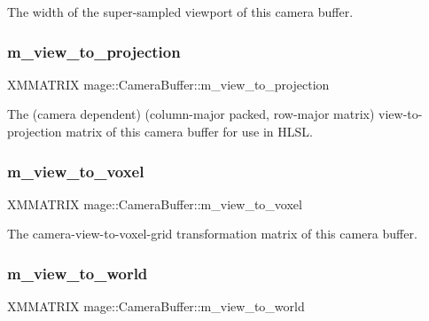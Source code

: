 The width of the super-\/sampled viewport of this camera buffer. \hypertarget{structmage_1_1_camera_buffer_aa23d2ecaed10960832215c2397884421}{}\label{structmage_1_1_camera_buffer_aa23d2ecaed10960832215c2397884421} 
\subsubsection{\texorpdfstring{m\+\_\+view\+\_\+to\+\_\+projection}{m\_view\_to\_projection}}
{\footnotesize\ttfamily X\+M\+M\+A\+T\+R\+IX mage\+::\+Camera\+Buffer\+::m\+\_\+view\+\_\+to\+\_\+projection}

The (camera dependent) (column-\/major packed, row-\/major matrix) view-\/to-\/projection matrix of this camera buffer for use in H\+L\+SL. \hypertarget{structmage_1_1_camera_buffer_aa019004337d0882c26fe9e742623a16c}{}\label{structmage_1_1_camera_buffer_aa019004337d0882c26fe9e742623a16c} 
\subsubsection{\texorpdfstring{m\+\_\+view\+\_\+to\+\_\+voxel}{m\_view\_to\_voxel}}
{\footnotesize\ttfamily X\+M\+M\+A\+T\+R\+IX mage\+::\+Camera\+Buffer\+::m\+\_\+view\+\_\+to\+\_\+voxel}

The camera-\/view-\/to-\/voxel-\/grid transformation matrix of this camera buffer. \hypertarget{structmage_1_1_camera_buffer_a2c06f8a346844fb99fadb43d128f9d72}{}\label{structmage_1_1_camera_buffer_a2c06f8a346844fb99fadb43d128f9d72} 
\subsubsection{\texorpdfstring{m\+\_\+view\+\_\+to\+\_\+world}{m\_view\_to\_world}}
{\footnotesize\ttfamily X\+M\+M\+A\+T\+R\+IX mage\+::\+Camera\+Buffer\+::m\+\_\+view\+\_\+to\+\_\+world}

